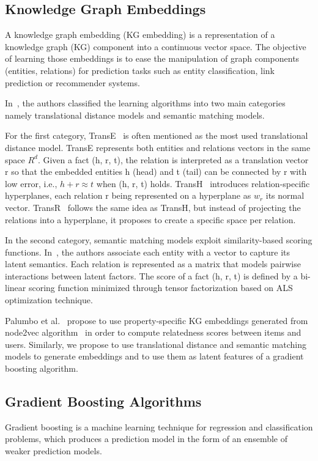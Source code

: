 \documentclass[11pt,dvipdfm]{article}
\begin{document}
\subsection{Knowledge Graph Embeddings}
\label{sec:sota-KGE}
A knowledge graph embedding (KG embedding) is a representation of a knowledge graph (KG) component into a continuous vector space. The objective of learning those embeddings is to ease the manipulation of graph components (entities, relations) for prediction tasks such as entity classification, link prediction or recommender systems.

In~\cite{Wang18}, the authors classified the learning algorithms into two main categories namely translational distance models and semantic matching models.

For the first category, TransE~\cite{bordes13} is often mentioned as the most used translational distance model. TransE represents both entities and relations vectors in the same space $R^{d}$. Given a fact (h, r, t), the relation is interpreted as a translation vector r so that the embedded entities h (head) and t (tail) can be connected by r with low error, i.e., $h+r \approx t$ when (h, r, t) holds. TransH~\cite{Wang14} introduces relation-specific hyperplanes, each relation r being represented on a hyperplane as $w_{r}$ its normal vector. TransR~\cite{Yankai15} follows the same idea as TransH, but instead of projecting the relations into a hyperplane, it proposes to create a specific space per relation.

In the second category, semantic matching models exploit similarity-based scoring functions. In~\cite{Maximilian11}, the authors associate each entity with a vector to capture its latent semantics. Each relation is represented as a matrix that models pairwise interactions between latent factors. The score of a fact (h, r, t) is defined by a bi-linear scoring function minimized through tensor factorization based on ALS optimization technique.

Palumbo et al.~\cite{Palumbo17} propose to use property-specific KG embeddings generated from node2vec algorithm~\cite{Aditya16} in order to compute relatedness scores between items and users. Similarly, we propose to use translational distance and semantic matching models to generate embeddings and to use them as latent features of a gradient boosting algorithm.

\subsection{Gradient Boosting Algorithms}
\label{sec:sota-gradient-boosting}
Gradient boosting is a machine learning technique for regression and classification problems, which produces a prediction model in the form of an ensemble of weaker prediction models. 
\end{document}
